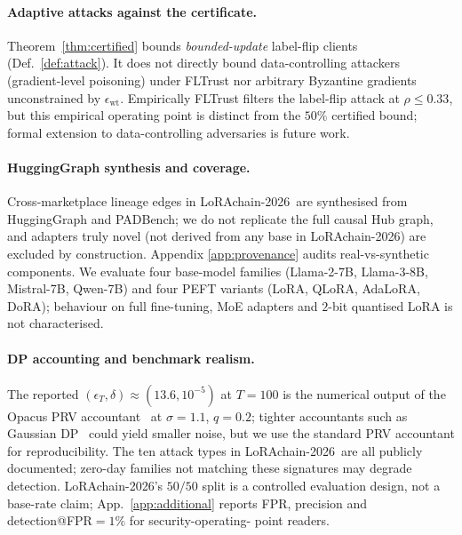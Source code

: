 \documentclass[11pt]{article}
\theoremstyle{plain}
\theoremstyle{definition}
\theoremstyle{remark}
\newcommand{\benchname}{LoRAchain-2026}
\begin{document}
\paragraph{Adaptive attacks against the certificate.}
Theorem~\ref{thm:certified} bounds \emph{bounded-update}
label-flip clients (Def.~\ref{def:attack}). It does not directly
bound data-controlling attackers (gradient-level poisoning) under
FLTrust nor arbitrary Byzantine gradients unconstrained by
$\epsilon_{\mathrm{wt}}$. Empirically FLTrust filters the
label-flip attack at $\rho\!\le\!0.33$, but this empirical
operating point is distinct from the $50\%$ certified bound;
formal extension to data-controlling adversaries is future work.

\paragraph{HuggingGraph synthesis and coverage.}
Cross-marketplace lineage edges in \benchname\ are synthesised
from HuggingGraph and PADBench; we do not replicate the full
causal Hub graph, and adapters truly novel (not derived from any
base in \benchname) are excluded by construction. Appendix
\ref{app:provenance} audits real-vs-synthetic components. We
evaluate four base-model families (Llama-2-7B, Llama-3-8B,
Mistral-7B, Qwen-7B) and four PEFT variants (LoRA, QLoRA,
AdaLoRA, DoRA); behaviour on full fine-tuning, MoE adapters and
$2$-bit quantised LoRA is not characterised.

\paragraph{DP accounting and benchmark realism.}
The reported $(\epsilon_T,\delta)\!\approx\!(13.6,10^{-5})$ at
$T\!=\!100$ is the numerical output of the Opacus PRV
accountant~\cite{gopi2021numerical} at $\sigma\!=\!1.1$,
$q\!=\!0.2$; tighter accountants such as Gaussian
DP~\cite{dong2022gaussian} could yield smaller noise, but we use
the standard PRV accountant for reproducibility. The ten attack
types in \benchname\ are all publicly documented; zero-day
families not matching these signatures may degrade detection.
\benchname's $50/50$ split is a controlled evaluation design, not
a base-rate claim; App.~\ref{app:additional} reports FPR,
precision and detection@FPR$\!=\!1\%$ for security-operating-
point readers.
\end{document}
